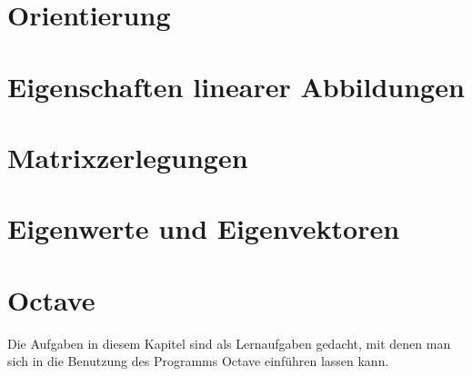 \documentclass[a4paper,12pt]{book}
\begin{document}
\chapter{Orientierung}

\chapter{Eigenschaften linearer Abbildungen}

\chapter{Matrixzerlegungen}

\chapter{Eigenwerte und Eigenvektoren}

\chapter{Octave}
Die Aufgaben in diesem Kapitel sind als Lernaufgaben gedacht, mit denen
man sich in die Benutzung des Programms Octave einführen lassen kann.

\bigskip

\closethemaindex
\printthemata

\end{document}
